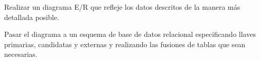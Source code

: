 \documentclass[12pt]{article}
\begin{document}
\begin{ejercicio}
    Realizar un diagrama E/R que refleje los datos descritos de la manera más detallada posible.
\end{ejercicio}
\begin{ejercicio}
    Pasar el diagrama a un esquema de base de datos relacional especificando llaves primarias, candidatas y externas y realizando las fusiones de tablas que sean necesarias.
\end{ejercicio}
\end{document}
